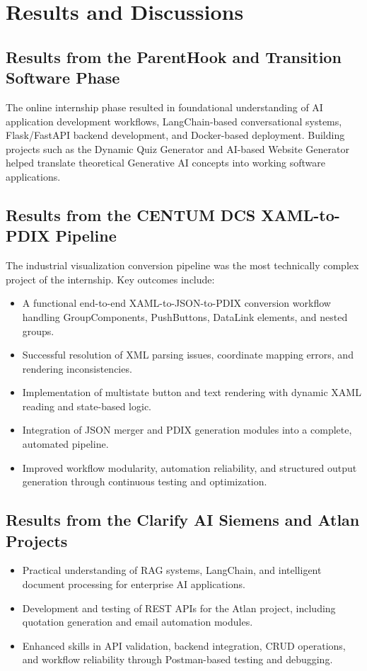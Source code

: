 \documentclass[12pt,a4paper]{report}
\begin{document}
\section{Results and Discussions}

\subsection{Results from the ParentHook and Transition Software Phase}

The online internship phase resulted in foundational understanding of AI application development workflows, LangChain-based conversational systems, Flask/FastAPI backend development, and Docker-based deployment. Building projects such as the Dynamic Quiz Generator and AI-based Website Generator helped translate theoretical Generative AI concepts into working software applications.

\subsection{Results from the CENTUM DCS XAML-to-PDIX Pipeline}

The industrial visualization conversion pipeline was the most technically complex project of the internship. Key outcomes include:
\begin{itemize}[leftmargin=1.5cm]
    \item A functional end-to-end XAML-to-JSON-to-PDIX conversion workflow handling GroupComponents, PushButtons, DataLink elements, and nested groups.
    \item Successful resolution of XML parsing issues, coordinate mapping errors, and rendering inconsistencies.
    \item Implementation of multistate button and text rendering with dynamic XAML reading and state-based logic.
    \item Integration of JSON merger and PDIX generation modules into a complete, automated pipeline.
    \item Improved workflow modularity, automation reliability, and structured output generation through continuous testing and optimization.
\end{itemize}

\subsection{Results from the Clarify AI Siemens and Atlan Projects}

\begin{itemize}[leftmargin=1.5cm]
    \item Practical understanding of RAG systems, LangChain, and intelligent document processing for enterprise AI applications.
    \item Development and testing of REST APIs for the Atlan project, including quotation generation and email automation modules.
    \item Enhanced skills in API validation, backend integration, CRUD operations, and workflow reliability through Postman-based testing and debugging.
\end{itemize}
\end{document}
